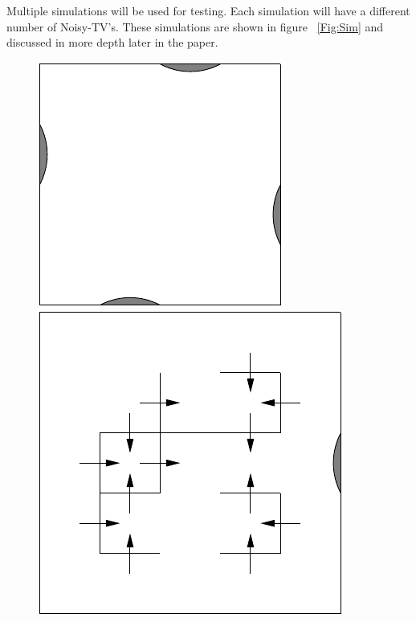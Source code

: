 \documentclass[12pt]{thesis}
\begin{document}
Multiple simulations will be used for testing. Each simulation will have a different number of Noisy-TV's. These simulations are shown in figure 
\figurename~\ref{Fig:Sim} and discussed in more depth later in the paper.
\begin{figure}
	\begin{center}
	  \includegraphics[scale=0.75]{"images/4-TV.pdf"}
          \hspace{0.5in}
	  \includegraphics[scale=0.75]{"images/1-TV.pdf"}
          \hspace{0.5in}

\end{center}
\end{figure}
\end{document}
